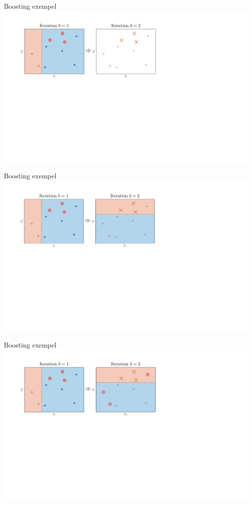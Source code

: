 \documentclass[10pt,english]{beamer}
\begin{document}
\begin{frame}{Boosting exempel}
    \includegraphics[width=\textwidth]{figs/Boosting illustration4.png}
\end{frame}

\begin{frame}{Boosting exempel}
    \includegraphics[width=\textwidth]{figs/Boosting illustration5.png}
\end{frame}

\begin{frame}{Boosting exempel}
    \includegraphics[width=\textwidth]{figs/Boosting illustration6.png}
\end{frame}
\end{document}

